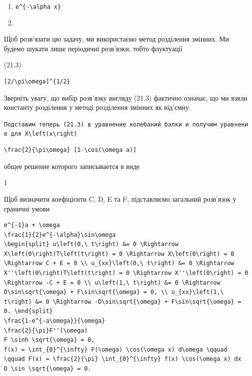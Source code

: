 \documentclass[
  ukrainian,
]{article}
\begin{document}
\begin{enumerate}
\def\labelenumi{\arabic{enumi}.}
\setcounter{enumi}{2}
\item
  \texttt{e\^{}\{-\textbackslash{}alpha\ x\}}
\item
\end{enumerate}

Щоб розв'язати цю задачу, ми використаємо метод розділення змінних. Ми
будемо шукати лише періодичні розв'язки, тобто флуктуації

(21.3)

\begin{verbatim}
[2/\pi\omega]^{1/2}
\end{verbatim}

Зверніть увагу, що вибір розв'язку вигляду (21.3) фактично означає, що
ми взяли константу розділення у методі розділення змінних як від'ємну.

\texttt{Подставим\ теперь\ (21.3)\ в\ уравнение\ колебаний\ балки\ и\ получим\ уравнение\ для\ \textquotesingle{}X\textbackslash{}left(x\textbackslash{}right)\textquotesingle{}}

\begin{verbatim}
\frac{2}{\pi\omega} [1-\cos(\omega a)]
\end{verbatim}

общее решение которого записывается в виде

1

Щоб визначити коефіцієнти C, D, E та F, підставляємо загальний розв'язок
у граничні умови

\begin{verbatim}
e^{-1}a + \omega
\frac{1}{2}e^{-\alpha}\sin\omega
\begin{split} u\left(0,\ t\right) &= 0 \Rightarrow X\left(0\right)T\left(t\right) = 0 \Rightarrow X\left(0\right) = 0 \Rightarrow C + E = 0 \\ u_{xx}\left(0,\ t\right) &= 0 \Rightarrow X''\left(0\right)T\left(t\right) = 0 \Rightarrow X''\left(0\right) = 0 \Rightarrow -C + E = 0 \\ u\left(1,\ t\right) &= 0 \Rightarrow D\sin\sqrt{\omega} + F\sin\sqrt{\omega} = 0, \\ u_{xx}\left(1,\ t\right) &= 0 \Rightarrow -D\sin\sqrt{\omega} + F\sin\sqrt{\omega} = 0. \end{split}
\frac{1-e^{-a\omega}}{\omega}
\frac{2}{\pi}F''(\omega)
F \sinh \sqrt{\omega} = 0,
f(x) = \int_{0}^{\infty} F(\omega) \cos(\omega x) d\omega \qquad \qquad F(x) = \frac{2}{\pi} \int_{0}^{\infty} f(x) \cos(\omega x) dx
D \sin \sqrt{\omega} = 0.
\end{verbatim}
\end{document}
